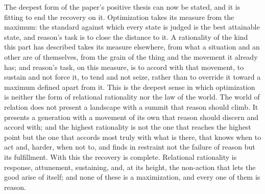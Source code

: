 The deepest form of the paper's positive thesis can now be stated, and it is fitting to end the recovery on it. Optimization takes its measure from the maximum: the standard against which every state is judged is the best attainable state, and reason's task is to close the distance to it. A rationality of the kind this part has described takes its measure elsewhere, from what a situation and an other are of themselves, from the grain of the thing and the movement it already has; and reason's task, on this measure, is to accord with that movement, to sustain and not force it, to tend and not seize, rather than to override it toward a maximum defined apart from it. This is the deepest sense in which optimization is neither the form of relational rationality nor the law of the world. The world of relation does not present a landscape with a summit that reason should climb. It presents a generation with a movement of its own that reason should discern and accord with; and the highest rationality is not the one that reaches the highest point but the one that accords most truly with what is there, that knows when to act and, harder, when not to, and finds in restraint not the failure of reason but its fulfillment. With this the recovery is complete. Relational rationality is response, attunement, sustaining, and, at its height, the non-action that lets the good arise of itself; and none of these is a maximization, and every one of them is reason.
